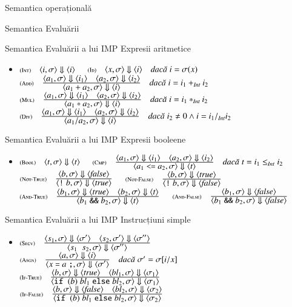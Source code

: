 \documentclass[xcolor=pdftex,romanian,colorlinks]{beamer}
\begin{document}
\begin{section}{Semantica operațională}
\begin{subsection}{Semantica Evaluării}
\begin{frame}{Semantica Evaluării a lui IMP}
{Expresii aritmetice}
\begin{itemize}
\item[] $\reg[Int]{\S{\c{i,\sigma}}{\c{i}}}{}{}$
\vitem[] $\reg[Id]{\S{\c{x,\sigma}}{\c{i}}}{}{i = \sigma(x)}$
\vitem[] $\reg[Add]{\S{\c{a_1 + a_2,\sigma}}{\c{i}}}{\S{\c{a_1,\sigma}}{\c{i_1}}\si\S{\c{a_2,\sigma}}{\c{i_2}}}{i = i_1 +_{\SInt} i_2}$
\vitem[] $\reg[Mul]{\S{\c{a_1 * a_2,\sigma}}{\c{i}}}{\S{\c{a_1,\sigma}}{\c{i_1}}\si\S{\c{a_2,\sigma}}{\c{i_2}}}{i = i_1 *_{\SInt} i_2}$
\vitem[] $\reg[Div]{\S{\c{a_1 / a_2,\sigma}}{\c{i}}}{\S{\c{a_1,\sigma}}{\c{i_1}}\si\S{\c{a_2,\sigma}}{\c{i_2}}}{i_2 \neq 0 \wedge i = i_1 /_{\SInt} i_2}$
\end{itemize}
\end{frame}
\begin{frame}{Semantica Evaluării a lui IMP}
{Expresii booleene}
\begin{itemize}
\item[] $\reg[Bool]{\S{\c{t,\sigma}}{\c{t}}}{}{}$
\vitem[] $\reg[Cmp]{\S{\c{a_1 \terminal{<=} a_2,\sigma}}{\c{t}}}{\S{\c{a_1,\sigma}}{\c{i_1}}\si\S{\c{a_2,\sigma}}{\c{i_2}}}{t = i_1 \leq_{\SInt} i_2}$
\vitem[] $\reg[Not-True]{\S{\c{\Snot b,\sigma}}{\c{\Strue}}}{\S{\c{b,\sigma}}{\c{\Sfalse}}}{}$
\hfill
$\reg[Not-False]{\S{\c{\Snot b,\sigma}}{\c{\Sfalse}}}{\S{\c{b,\sigma}}{\c{\Strue}}}{}$
\vitem[] $\reg[And-True]{\S{\c{b_1 \terminal{\&\&} b_2,\sigma}}{\c{t}}}{\S{\c{b_1,\sigma}}{\c{\Strue}}\si\S{\c{b_2,\sigma}}{\c{t}}}{}$
\vitem[] $\reg[And-False]{\S{\c{b_1 \terminal{\&\&} b_2,\sigma}}{\c{\Sfalse}}}{\S{\c{b_1,\sigma}}{\c{\Sfalse}}}{}$
\end{itemize}
\end{frame}
\begin{frame}{Semantica Evaluării a lui IMP}
{Instrucțiuni simple}
\begin{itemize}
\item[] $\reg[Secv]{\S{\c{s_1 \mathrel{} s_2,\sigma}}{\c{\sigma''}}}{\S{\c{s_1,\sigma}}{\c{\sigma'}}\si\S{\c{s_2,\sigma'}}{\c{\sigma''}}}{}$
\vitem[] $\reg[Asgn]{\S{\c{x \terminal{=} a \terminal{;}, \sigma}}{\c{\sigma'}}}{\S{\c{a,\sigma}}{\c{i}}}{\sigma' = \sigma[i/x]}$
\vitem[] $\reg[If-True]{\S{\c{\Sif\;(b)\;{\it bl}_1\Selse {\it bl}_2,\sigma}}{\c{\sigma_1}}}{\S{\c{b,\sigma}}{\c{\Strue}}\si \S{\c{{\it bl}_1,\sigma}}{\c{\sigma_1}}}{}$
\vitem[] $\reg[If-False]{\S{\c{\Sif\;(b)\;{\it bl}_1\Selse {\it bl}_2,\sigma}}{\c{\sigma_2}}}{\S{\c{b,\sigma}}{\c{\Sfalse}}\si \S{\c{{\it bl}_2,\sigma}}{\c{\sigma_2}}}{}$

\end{itemize}
\end{frame}
\end{subsection}
\end{section}
\end{document}
